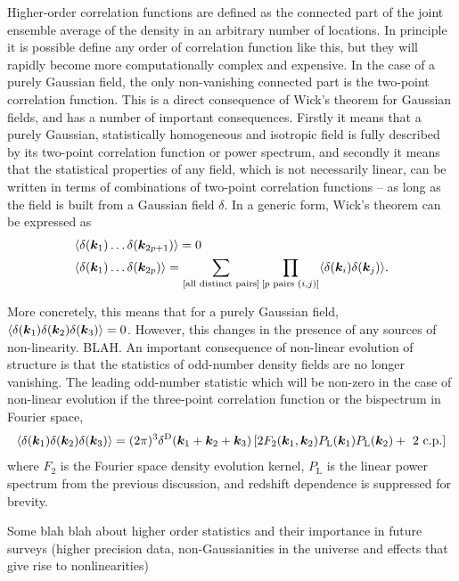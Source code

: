 Higher-order correlation functions are defined as the connected part of the joint ensemble average of the density in an arbitrary number of locations. In principle it is possible define any order of correlation function like this, but they will rapidly become more computationally complex and expensive. In the case of a purely Gaussian field, the only non-vanishing connected part is the two-point correlation function. This is a direct consequence of Wick's theorem for Gaussian fields, and has a number of important consequences. Firstly it means that a purely Gaussian, statistically homogeneous and isotropic field is fully described by its two-point correlation function or power spectrum, and secondly it means that the statistical properties of any field, which is not necessarily linear, can be written in terms of combinations of two-point correlation functions -- as long as the field is built from a Gaussian field $\delta$. In a generic form, Wick's theorem can be expressed as 
\begin{align}
	&\langle \delta(\bm {k}_1) \ldots \delta(\bm{k}_{2p + 1}) \rangle = 0 \nonumber \\
	&\langle \delta(\bm {k}_1) \ldots \delta(\bm{k}_{2p})\rangle = \sum_{[\text{all distinct pairs}]} \prod_{[p \text{ pairs } (i,j)]} \langle \delta(\bm{k}_i) \delta(\bm{k}_j) \rangle.  
\end{align}

More concretely, this means that for a purely Gaussian field, $\langle \delta(\bm {k}_1) \delta(\bm {k}_2) \delta(\bm {k}_3)\rangle = 0$. However, this changes in the presence of any sources of non-linearity. BLAH. An important consequence of non-linear evolution of structure is that the statistics of odd-number density fields are no longer vanishing. The leading odd-number statistic which will be non-zero in the case of non-linear evolution if the three-point correlation function or the bispectrum in Fourier space, 
\begin{equation}
	\langle \delta(\bm {k}_1) \delta(\bm {k}_2) \delta(\bm {k}_3) \rangle = (2 \pi )^3 \delta^\mathrm{D}(\bm {k}_1 + \bm {k}_2 + \bm {k}_3) \left[ 2 F_2(\bm {k}_1,\bm {k}_2) P_\mathrm{L}(\bm {k}_1) P_\mathrm{L}(\bm {k}_2) + \text{ 2 c.p.} \right]
\end{equation}
where $F_2$ is the Fourier space density evolution kernel, $P_\mathrm{L}$ is the linear power spectrum from the previous discussion, and redshift dependence is suppressed for brevity. 

Some blah blah about higher order statistics and their importance in future surveys (higher precision data, non-Gaussianities in the universe and effects that give rise to nonlinearities)

